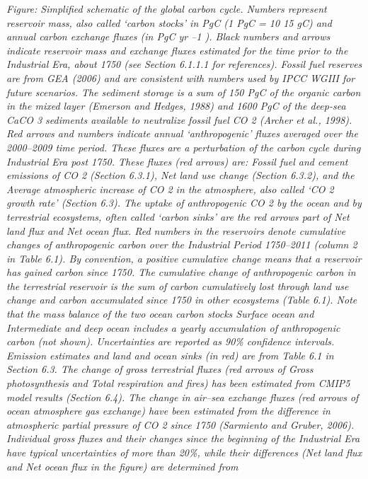 \documentclass[
]{book}
\begin{document}
\emph{Figure: Simplified schematic of the global carbon cycle. Numbers represent reservoir mass, also called `carbon stocks' in PgC (1 PgC = 10 15 gC) and annual carbon exchange
fluxes (in PgC yr --1 ). Black numbers and arrows indicate reservoir mass and exchange fluxes estimated for the time prior to the Industrial Era, about 1750 (see Section 6.1.1.1 for
references). Fossil fuel reserves are from GEA (2006) and are consistent with numbers used by IPCC WGIII for future scenarios. The sediment storage is a sum of 150 PgC of the
organic carbon in the mixed layer (Emerson and Hedges, 1988) and 1600 PgC of the deep-sea CaCO 3 sediments available to neutralize fossil fuel CO 2 (Archer et al., 1998). Red
arrows and numbers indicate annual `anthropogenic' fluxes averaged over the 2000--2009 time period. These fluxes are a perturbation of the carbon cycle during Industrial Era
post 1750. These fluxes (red arrows) are: Fossil fuel and cement emissions of CO 2 (Section 6.3.1), Net land use change (Section 6.3.2), and the Average atmospheric increase of
CO 2 in the atmosphere, also called `CO 2 growth rate' (Section 6.3). The uptake of anthropogenic CO 2 by the ocean and by terrestrial ecosystems, often called `carbon sinks' are
the red arrows part of Net land flux and Net ocean flux. Red numbers in the reservoirs denote cumulative changes of anthropogenic carbon over the Industrial Period 1750--2011
(column 2 in Table 6.1). By convention, a positive cumulative change means that a reservoir has gained carbon since 1750. The cumulative change of anthropogenic carbon in the
terrestrial reservoir is the sum of carbon cumulatively lost through land use change and carbon accumulated since 1750 in other ecosystems (Table 6.1). Note that the mass balance
of the two ocean carbon stocks Surface ocean and Intermediate and deep ocean includes a yearly accumulation of anthropogenic carbon (not shown). Uncertainties are reported
as 90\% confidence intervals. Emission estimates and land and ocean sinks (in red) are from Table 6.1 in Section 6.3. The change of gross terrestrial fluxes (red arrows of Gross
photosynthesis and Total respiration and fires) has been estimated from CMIP5 model results (Section 6.4). The change in air--sea exchange fluxes (red arrows of ocean atmosphere
gas exchange) have been estimated from the difference in atmospheric partial pressure of CO 2 since 1750 (Sarmiento and Gruber, 2006). Individual gross fluxes and their changes
since the beginning of the Industrial Era have typical uncertainties of more than 20\%, while their differences (Net land flux and Net ocean flux in the figure) are determined from
}
\end{document}
